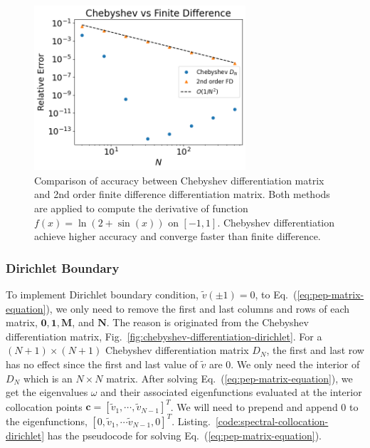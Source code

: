 \begin{figure}
	\centering
	\includegraphics[width=0.7\textwidth]{figures/chebyshev-vs-fd.png}
	\caption{Comparison of accuracy between Chebyshev differentiation matrix and 2nd order finite difference differentiation matrix. Both methods are applied to compute the derivative of function $f(x)=\ln(2+\sin(x))$ on $[-1,1]$. Chebyshev differentiation achieve higher accuracy and converge faster than finite difference.}
	\label{fig:chebyshev-vs-fd}
\end{figure}

\subsubsection*{Dirichlet Boundary}
To implement Dirichlet boundary condition, $\tilde{v}(\pm 1)=0$, to Eq.~(\ref{eq:pep-matrix-equation}), we only need to remove the first and last columns and rows of each matrix, $\mathbf{0,1,M}$, and $\mathbf{N}$. The reason is originated from the Chebyshev differentiation matrix, Fig.~\ref{fig:chebyshev-differentiation-dirichlet}. For a $(N+1)\times(N+1)$ Chebyshev differentiation matrix $D_N$, the first and last row has no effect since the first and last value of $\tilde{v}$ are $0$. We only need the interior of $D_N$ which is an $N\times N$ matrix. After solving Eq.~(\ref{eq:pep-matrix-equation}), we get the eigenvalues $\omega$ and their associated eigenfunctions evaluated at the interior collocation points $\mathbf{c} = [\tilde{v}_1,\cdots,\tilde{v}_{N-1}]^T$. We will need to prepend and append 0 to the eigenfunctions, $[0, \tilde{v}_1,\cdots\tilde{v}_{N-1}, 0]^T$. Listing.~\ref{code:spectral-collocation-dirichlet} has the pseudocode for solving Eq.~(\ref{eq:pep-matrix-equation}).

